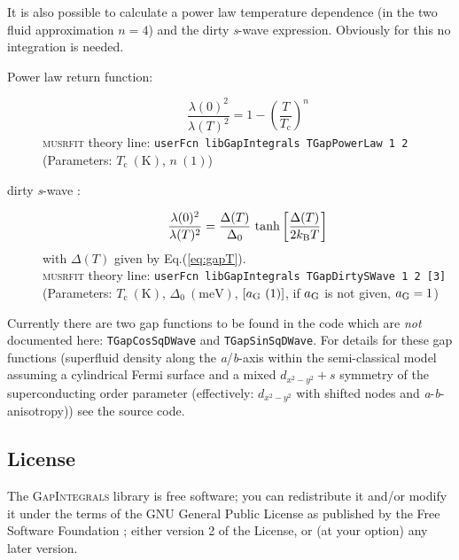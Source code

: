 \documentclass[twoside]{article}
\newcommand{\musrfit}{\textsc{musrfit}\xspace}
\newcommand{\gapint}{\textsc{GapIntegrals}\xspace}
\begin{document}
\noindent It is also possible to calculate a power law temperature dependence (in the two fluid approximation $n=4$) and the dirty \textit{s}-wave expression. 
Obviously for this no integration is needed.
\begin{description}
 \item[Power law return function:] 
   \begin{equation}
     \frac{\lambda(0)^2}{\lambda(T)^2} = 1-\left(\frac{T}{T_{\mathrm c}}\right)^n
   \end{equation}
   \musrfit theory line: \verb?userFcn libGapIntegrals TGapPowerLaw 1 2?\\
   (Parameters: $T_{\mathrm c}~(\mathrm{K})$, $n~(1)$)
 \item[dirty \textit{s}-wave \cite{Tinkham}:]
    \begin{equation}
      \frac{\lambda(0)^2}{\lambda(T)^2} = \frac{\Delta(T)}{\Delta_0}\,\tanh\left[\frac{\Delta(T)}{2 k_{\rm B} T}\right]
    \end{equation}
    with $\Delta(T)$ given by Eq.(\ref{eq:gapT}).\\ 
    \musrfit theory line: \verb?userFcn libGapIntegrals TGapDirtySWave 1 2 [3]?\\
    (Parameters: $T_{\mathrm c}~(\mathrm{K})$, $\Delta_0~(\mathrm{meV})$, $[a_{\rm G}~(1)]$, if $a_{\rm G}$ is not given, $a_{\rm G} = 1$)
\end{description}

\noindent Currently there are two gap functions to be found in the code which are \emph{not} documented here: 
\verb?TGapCosSqDWave? and \verb?TGapSinSqDWave?. For details for these gap functions (superfluid density along the \textit{a}/\textit{b}-axis
within the semi-classical model assuming a cylindrical Fermi surface and a mixed $d_{x^2-y^2} + s$ symmetry of the superconducting order parameter 
(effectively: $d_{x^2-y^2}$ with shifted nodes and \textit{a}-\textit{b}-anisotropy)) see the source code.

\subsection*{License}
The \gapint library is free software; you can redistribute it and/or modify it under the terms of the GNU General Public License as published by the Free Software Foundation \cite{GPL}; either version 2 of the License, or (at your option) any later version.
\end{document}
